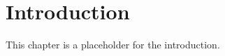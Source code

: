 \chapter{Introduction}\label{chap:introduction}

This chapter is a placeholder for the introduction.
